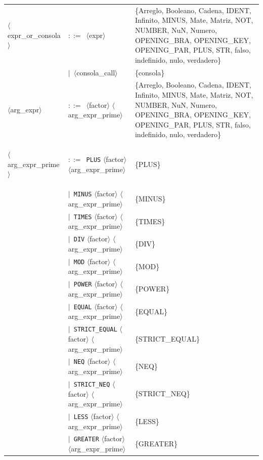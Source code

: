 \documentclass[10pt]{article}
\begin{document}
{\begin{longtable}{@{} p{2.0cm} p{6.9cm} p{6.9cm} @{}}
  \midrule
  \textcolor{ntcolor}{\parbox[t]{1.8cm}{\raggedright$\langle$expr\_\allowbreak{}or\_\allowbreak{}consola$\rangle$}} & $::=$~$\langle$expr$\rangle$ & \{Arreglo, Booleano, Cadena, IDENT, Infinito, MINUS, Mate, Matriz, NOT, NUMBER, NuN, Numero, OPENING\_BRA, OPENING\_KEY, OPENING\_PAR, PLUS, STR, falso, indefinido, nulo, verdadero\} \\
   & $\mid$~$\langle$consola\_call$\rangle$ & \{consola\} \\
  \midrule
  \textcolor{ntcolor}{\parbox[t]{1.8cm}{\raggedright$\langle$arg\_\allowbreak{}expr$\rangle$}} & $::=$~$\langle$factor$\rangle$ $\langle$arg\_expr\_prime$\rangle$ & \{Arreglo, Booleano, Cadena, IDENT, Infinito, MINUS, Mate, Matriz, NOT, NUMBER, NuN, Numero, OPENING\_BRA, OPENING\_KEY, OPENING\_PAR, PLUS, STR, falso, indefinido, nulo, verdadero\} \\
  \midrule
  \textcolor{ntcolor}{\parbox[t]{1.8cm}{\raggedright$\langle$arg\_\allowbreak{}expr\_\allowbreak{}prime$\rangle$}} & $::=$~\texttt{PLUS} $\langle$factor$\rangle$ $\langle$arg\_expr\_prime$\rangle$ & \{PLUS\} \\
   & $\mid$~\texttt{MINUS} $\langle$factor$\rangle$ $\langle$arg\_expr\_prime$\rangle$ & \{MINUS\} \\
   & $\mid$~\texttt{TIMES} $\langle$factor$\rangle$ $\langle$arg\_expr\_prime$\rangle$ & \{TIMES\} \\
   & $\mid$~\texttt{DIV} $\langle$factor$\rangle$ $\langle$arg\_expr\_prime$\rangle$ & \{DIV\} \\
   & $\mid$~\texttt{MOD} $\langle$factor$\rangle$ $\langle$arg\_expr\_prime$\rangle$ & \{MOD\} \\
   & $\mid$~\texttt{POWER} $\langle$factor$\rangle$ $\langle$arg\_expr\_prime$\rangle$ & \{POWER\} \\
   & $\mid$~\texttt{EQUAL} $\langle$factor$\rangle$ $\langle$arg\_expr\_prime$\rangle$ & \{EQUAL\} \\
   & $\mid$~\texttt{STRICT\_EQUAL} $\langle$factor$\rangle$ $\langle$arg\_expr\_prime$\rangle$ & \{STRICT\_EQUAL\} \\
   & $\mid$~\texttt{NEQ} $\langle$factor$\rangle$ $\langle$arg\_expr\_prime$\rangle$ & \{NEQ\} \\
   & $\mid$~\texttt{STRICT\_NEQ} $\langle$factor$\rangle$ $\langle$arg\_expr\_prime$\rangle$ & \{STRICT\_NEQ\} \\
   & $\mid$~\texttt{LESS} $\langle$factor$\rangle$ $\langle$arg\_expr\_prime$\rangle$ & \{LESS\} \\
   & $\mid$~\texttt{GREATER} $\langle$factor$\rangle$ $\langle$arg\_expr\_prime$\rangle$ & \{GREATER\} \\

\end{longtable}}
\end{document}
